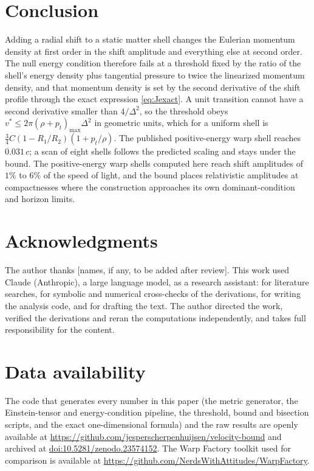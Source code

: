 \documentclass[11pt,a4paper]{article}
\theoremstyle{remark}
\begin{document}
\section{Conclusion}

Adding a radial shift to a static matter shell changes the Eulerian momentum density at first order in the shift amplitude and everything else at second order. The null energy condition therefore fails at a threshold fixed by the ratio of the shell's energy density plus tangential pressure to twice the linearized momentum density, and that momentum density is set by the second derivative of the shift profile through the exact expression \eqref{eq:Jexact}. A unit transition cannot have a second derivative smaller than $4/\Delta^2$, so the threshold obeys $v^* \le 2\pi(\rho+p_t)_{\max}\Delta^2$ in geometric units, which for a uniform shell is $\tfrac34 C(1-R_1/R_2)(1+p_t/\rho)$. The published positive-energy warp shell reaches $0.031\,c$; a scan of eight shells follows the predicted scaling and stays under the bound. The positive-energy warp shells computed here reach shift amplitudes of $1\%$ to $6\%$ of the speed of light, and the bound places relativistic amplitudes at compactnesses where the construction approaches its own dominant-condition and horizon limits.

\section*{Acknowledgments}
The author thanks [names, if any, to be added after review]. This work used Claude (Anthropic), a large language model, as a research assistant: for literature searches, for symbolic and numerical cross-checks of the derivations, for writing the analysis code, and for drafting the text. The author directed the work, verified the derivations and reran the computations independently, and takes full responsibility for the content.

\section*{Data availability}
The code that generates every number in this paper (the metric generator, the Einstein-tensor and energy-condition pipeline, the threshold, bound and bisection scripts, and the exact one-dimensional formula) and the raw results are openly available at \url{https://github.com/jesperscherpenhuijsen/velocity-bound} and archived at \href{https://doi.org/10.5281/zenodo.23574152}{doi:10.5281/zenodo.23574152}. The Warp Factory toolkit used for comparison is available at \url{https://github.com/NerdsWithAttitudes/WarpFactory}.
\end{document}
